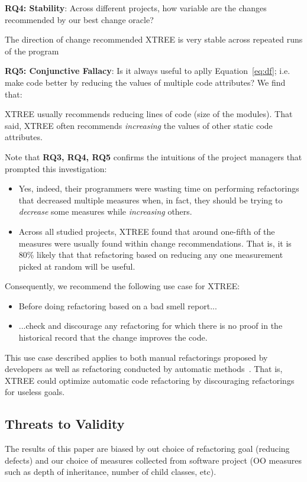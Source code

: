 \documentclass[twocolumn,5p]{elsarticle}
\newcommand{\bi}{\begin{itemize}[leftmargin=0.4cm]}
\newcommand{\ei}{\end{itemize}}
\newcommand{\eq}[1]{Equation~\ref{eq:#1}}
\theoremstyle{break}
\begin{document}
 {\bf RQ4: Stability}: Across different projects, how variable are the changes recommended by our best change oracle?
\begin{lesson}
The direction of change recommended  XTREE is  very stable across repeated runs of the program 
\end{lesson} 

{\bf RQ5: Conjunctive Fallacy}:  
Is it always  useful  to aplly \eq{df}; i.e. make code better by   reducing the values of  multiple code attributes? We find that:
\begin{lesson}
XTREE usually recommends reducing lines of code (size of the modules).
That said,  XTREE often recommends {\em increasing} the values of other static code attributes.
\end{lesson} 
Note that {\bf RQ3, RQ4, RQ5} 
confirms the intuitions
of the project managers that prompted this investigation:
\bi
\item
Yes,  indeed, their programmers
were wasting time on   performing refactorings  that  decreased multiple measures when, in fact,
they should be trying to {\em decrease} some measures while {\em increasing} others.
\item
Across all studied projects, XTREE found that  around one-fifth  
  of the measures were usually found within  change recommendations. That is, it is 80\% likely that
  that refactoring based on reducing any one measurement picked at random will be useful.
\ei
Consequently, we  recommend the following use case for  XTREE:
\bi
\item Before doing  refactoring based on a bad smell report...
\item ...check and discourage any refactoring   for which there is no proof
  in the historical record that the change improves the code.
\ei
This use case described  applies to both manual refactorings proposed by developers
as well as refactoring conducted by automatic methods~\cite{mkaouer2015many}. That is, XTREE could optimize automatic
code refactoring by discouraging refactorings for useless goals.
 


\subsection{ Threats to Validity}
 
The results of this paper are biased by out choice of refactoring goal (reducing defects) and our choice
of measures collected from software project (OO measures such as
  depth of inheritance, number of child classes, etc).
  
\end{document}
